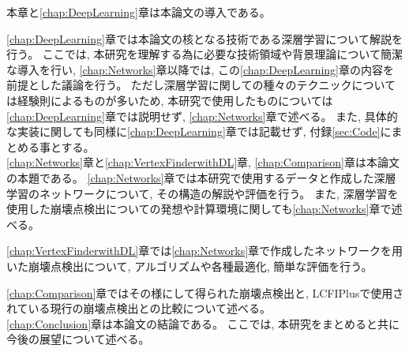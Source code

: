本章と\ref{chap:DeepLearning}章は本論文の導入である。

\ref{chap:DeepLearning}章では本論文の核となる技術である深層学習について解説を行う。
ここでは, 本研究を理解する為に必要な技術領域や背景理論について簡潔な導入を行い, \ref{chap:Networks}章以降では, この\ref{chap:DeepLearning}章の内容を前提とした議論を行う。
ただし深層学習に関しての種々のテクニックについては経験則によるものが多いため, 本研究で使用したものについては\ref{chap:DeepLearning}章では説明せず, \ref{chap:Networks}章で述べる。
また, 具体的な実装に関しても同様に\ref{chap:DeepLearning}章では記載せず, 付録\ref{sec:Code}にまとめる事とする。\\
\newpage
\ref{chap:Networks}章と\ref{chap:VertexFinderwithDL}章, \ref{chap:Comparison}章は本論文の本題である。
\ref{chap:Networks}章では本研究で使用するデータと作成した深層学習のネットワークについて, その構造の解説や評価を行う。
また, 深層学習を使用した崩壊点検出についての発想や計算環境に関しても\ref{chap:Networks}章で述べる。

\ref{chap:VertexFinderwithDL}章では\ref{chap:Networks}章で作成したネットワークを用いた崩壊点検出について, アルゴリズムや各種最適化, 簡単な評価を行う。

\ref{chap:Comparison}章ではその様にして得られた崩壊点検出と, LCFIPlusで使用されている現行の崩壊点検出との比較について述べる。\\

\ref{chap:Conclusion}章は本論文の結論である。
ここでは, 本研究をまとめると共に今後の展望について述べる。

















